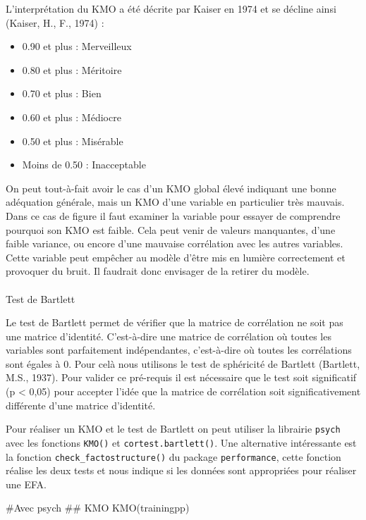 \documentclass[
  french,
  11pt,
  a4paper,
]{article}
\makeatletter
\let\oldparagraph\paragraph
\renewcommand{\paragraph}{
    \@ifstar
      \xxxParagraphStar
      \xxxParagraphNoStar
  }
\newcommand{\xxxParagraphStar}[1]{\oldparagraph*{#1}\mbox{}}
\newcommand{\xxxParagraphNoStar}[1]{\oldparagraph{#1}\mbox{}}
\newenvironment{Shaded}{}{}
\newcommand{\CommentTok}[1]{\textcolor[rgb]{0.42,0.45,0.49}{#1}}
\newcommand{\DocumentationTok}[1]{\textcolor[rgb]{0.42,0.45,0.49}{#1}}
\newcommand{\FunctionTok}[1]{\textcolor[rgb]{0.44,0.26,0.76}{#1}}
\newcommand{\NormalTok}[1]{\textcolor[rgb]{0.14,0.16,0.18}{#1}}
\providecommand{\tightlist}{%
  \setlength{\itemsep}{0pt}\setlength{\parskip}{0pt}}
\makeatother
\begin{document}
L'interprétation du KMO a été décrite par Kaiser en 1974 et se décline
ainsi (Kaiser, H., F., 1974) :

\begin{itemize}
\tightlist
\item
  0.90 et plus : Merveilleux
\item
  0.80 et plus : Méritoire
\item
  0.70 et plus : Bien
\item
  0.60 et plus : Médiocre
\item
  0.50 et plus : Misérable
\item
  Moins de 0.50 : Inacceptable
\end{itemize}

On peut tout-à-fait avoir le cas d'un KMO global élevé indiquant une
bonne adéquation générale, mais un KMO d'une variable en particulier
très mauvais. Dans ce cas de figure il faut examiner la variable pour
essayer de comprendre pourquoi son KMO est faible. Cela peut venir de
valeurs manquantes, d'une faible variance, ou encore d'une mauvaise
corrélation avec les autres variables. Cette variable peut empêcher au
modèle d'être mis en lumière correctement et provoquer du bruit. Il
faudrait donc envisager de la retirer du modèle.

\paragraph{Test de Bartlett}\label{test-de-bartlett}

Le test de Bartlett permet de vérifier que la matrice de corrélation ne
soit pas une matrice d'identité. C'est-à-dire une matrice de corrélation
où toutes les variables sont parfaitement indépendantes, c'est-à-dire où
toutes les corrélations sont égales à 0. Pour celà nous utilisons le
test de sphéricité de Bartlett (Bartlett, M.S., 1937). Pour valider ce
pré-requis il est nécessaire que le test soit significatif (p
\textless{} 0,05) pour accepter l'idée que la matrice de corrélation
soit significativement différente d'une matrice d'identité.

Pour réaliser un KMO et le test de Bartlett on peut utiliser la
librairie \texttt{psych} avec les fonctions \texttt{KMO()} et
\texttt{cortest.bartlett()}. Une alternative intéressante est la
fonction \texttt{check\_factostructure()} du package
\texttt{performance}, cette fonction réalise les deux tests et nous
indique si les données sont appropriées pour réaliser une EFA.

\begin{Shaded}
\begin{Highlighting}[]
\CommentTok{\#Avec psych}
\DocumentationTok{\#\# KMO}
\FunctionTok{KMO}\NormalTok{(trainingpp)}
\end{Highlighting}
\end{Shaded}
\end{document}
